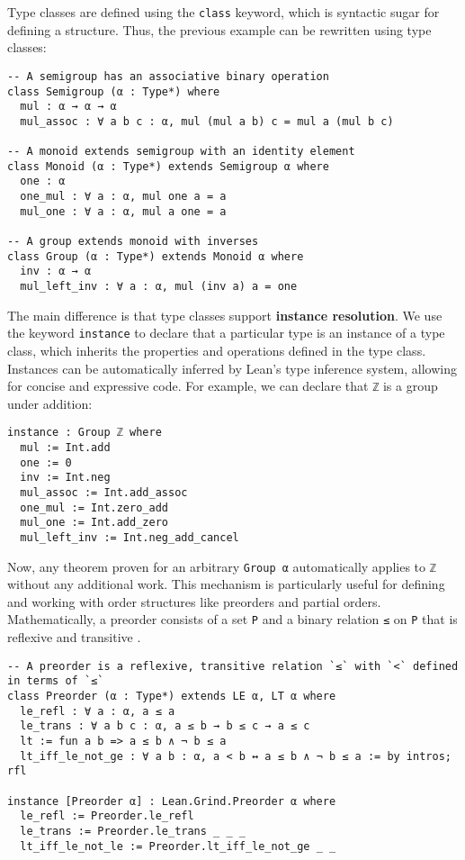 Type classes are defined using the \lstinline[language=lean]|class| keyword,
which is syntactic sugar for defining a structure. Thus, the previous example
can be rewritten using type classes:
\newpage
\begin{lstlisting}[language=lean]
-- A semigroup has an associative binary operation
class Semigroup (α : Type*) where
  mul : α → α → α
  mul_assoc : ∀ a b c : α, mul (mul a b) c = mul a (mul b c)

-- A monoid extends semigroup with an identity element  
class Monoid (α : Type*) extends Semigroup α where
  one : α
  one_mul : ∀ a : α, mul one a = a
  mul_one : ∀ a : α, mul a one = a

-- A group extends monoid with inverses
class Group (α : Type*) extends Monoid α where
  inv : α → α
  mul_left_inv : ∀ a : α, mul (inv a) a = one
\end{lstlisting}
The main difference is that type classes support \textbf{instance resolution}.
We use the keyword \lstinline[language=lean]|instance| to declare that a particular type is an
instance of a type class, which inherits the properties and operations defined in the type class.
Instances can be automatically inferred by Lean's type inference system,
allowing for concise and expressive code.
For example, we can declare that \lstinline[language=lean]|ℤ| is a group under addition:
\begin{lstlisting}[language=lean]
instance : Group ℤ where
  mul := Int.add
  one := 0
  inv := Int.neg
  mul_assoc := Int.add_assoc
  one_mul := Int.zero_add
  mul_one := Int.add_zero
  mul_left_inv := Int.neg_add_cancel
\end{lstlisting}
Now, any theorem proven for an arbitrary \lstinline[language=lean]|Group α|
automatically applies to \lstinline[language=lean]|ℤ| without any additional work.
This mechanism is particularly useful for defining and working with order structures
like preorders and partial orders. Mathematically, a preorder consists
of a set \lstinline[language=lean]|P| and a binary relation \lstinline[language=lean]|≤|
on \lstinline[language=lean]|P| that is reflexive and transitive \cite{mathinlean}.
\newpage
\begin{lstlisting}[language=lean, caption=Preorder Type Class in Lean]
-- A preorder is a reflexive, transitive relation `≤` with `<` defined in terms of `≤`
class Preorder (α : Type*) extends LE α, LT α where
  le_refl : ∀ a : α, a ≤ a
  le_trans : ∀ a b c : α, a ≤ b → b ≤ c → a ≤ c
  lt := fun a b => a ≤ b ∧ ¬ b ≤ a
  lt_iff_le_not_ge : ∀ a b : α, a < b ↔ a ≤ b ∧ ¬ b ≤ a := by intros; rfl

instance [Preorder α] : Lean.Grind.Preorder α where
  le_refl := Preorder.le_refl
  le_trans := Preorder.le_trans _ _ _
  lt_iff_le_not_le := Preorder.lt_iff_le_not_ge _ _
\end{lstlisting}

